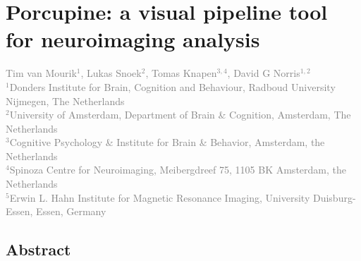 
\chapter{Porcupine: a visual pipeline tool for neuroimaging analysis}
\label{ch:porcupine}

\textcolor{gray}{{Tim van Mourik$^{1}$}, Lukas Snoek$^{2}$, Tomas Knapen$^{3,4}$, David G Norris$^{1,2}$\\
$^{1}$Donders Institute for Brain, Cognition and Behaviour, Radboud University Nijmegen, The Netherlands\\
$^{2}$University of Amsterdam, Department of Brain \& Cognition, Amsterdam, The Netherlands\\
$^{3}$Cognitive Psychology \& Institute for Brain \& Behavior, Amsterdam, the Netherlands\\
$^{4}$Spinoza Centre for Neuroimaging, Meibergdreef 75, 1105 BK Amsterdam, the Netherlands\\
$^{5}$Erwin L. Hahn Institute for Magnetic Resonance Imaging, University Duisburg-Essen, Essen, Germany}\\


\linespread{1.5}
\newpage
\section*{Abstract}


\newpage







